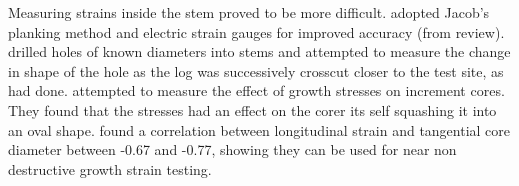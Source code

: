 Measuring strains inside the stem proved to be more difficult. \cite{kikata1972}
adopted Jacob's planking method and electric strain gauges for improved accuracy (from \cite{kubler_1987} review).
\cite{wilhelmy1973probe} drilled holes of known diameters into stems and
attempted to measure the change in shape of the hole as the log was successively
crosscut closer to the test site, as \cite{boyd1950a} had done. \cite{ISI:A1979HU45700004}  attempted to measure the effect of growth stresses on increment cores.
They found that the stresses had an effect on the corer its self
squashing it into an oval shape. \cite{FERRAND_1982} found a correlation between
longitudinal strain and tangential core diameter between -0.67 and -0.77, showing
they can be used for near non destructive growth strain testing.